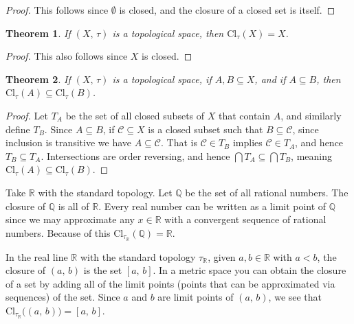 \documentclass{article}
\theoremstyle{plain}
\newtheorem{theorem}{Theorem}[section]
\theoremstyle{normal}
\newenvironment{example}{%
    \pushQED{\qed}\renewcommand{\qedsymbol}{$\blacksquare$}\examplex%
}{%
    \popQED\endexamplex%
}
\begin{document}
        \begin{proof}
            This follows since $\emptyset$ is closed, and the closure of a
            closed set is itself.
        \end{proof}
        \begin{theorem}
            If $(X,\,\tau)$ is a topological space, then
            $\textrm{Cl}_{\tau}(X)=X$.
        \end{theorem}
        \begin{proof}
            This also follows since $X$ is closed.
        \end{proof}
        \begin{theorem}
            If $(X,\,\tau)$ is a topological space, if $A,B\subseteq{X}$, and
            if $A\subseteq{B}$, then
            $\textrm{Cl}_{\tau}(A)\subseteq\textrm{Cl}_{\tau}(B)$.
        \end{theorem}
        \begin{proof}
            Let $T_{A}$ be the set of all closed subsets of $X$ that contain
            $A$, and similarly define $T_{B}$. Since $A\subseteq{B}$, if
            $\mathcal{C}\subseteq{X}$ is a closed subset such that
            $B\subseteq\mathcal{C}$, since inclusion is transitive we have
            $A\subseteq\mathcal{C}$. That is $\mathcal{C}\in{T}_{B}$ implies
            $\mathcal{C}\in{T}_{A}$, and hence
            $T_{B}\subseteq{T}_{A}$. Intersections are order reversing, and
            hence $\bigcap{T}_{A}\subseteq\bigcap{T}_{B}$, meaning
            $\textrm{Cl}_{\tau}(A)\subseteq\textrm{Cl}_{\tau}(B)$.
        \end{proof}
        \begin{example}
            Take $\mathbb{R}$ with the standard topology. Let $\mathbb{Q}$
            be the set of all rational numbers. The closure of
            $\mathbb{Q}$ is all of $\mathbb{R}$. Every real number can be
            written as a limit point of $\mathbb{Q}$ since we may approximate
            any $x\in\mathbb{R}$ with a convergent sequence of rational numbers.
            Because of this
            $\textrm{Cl}_{\tau_{\mathbb{R}}}(\mathbb{Q})=\mathbb{R}$.
        \end{example}
        \begin{example}
            In the real line $\mathbb{R}$ with the standard topology
            $\tau_{\mathbb{R}}$, given $a,b\in\mathbb{R}$ with $a<b$, the
            closure of $(a,\,b)$ is the set $[a,\,b]$. In a metric space
            you can obtain the closure of a set by adding all of the
            limit points (points that can be approximated via sequences) of
            the set. Since $a$ and $b$ are limit points of $(a,\,b)$, we
            see that $\textrm{Cl}_{\tau_{\mathbb{R}}}\big((a,\,b)\big)=[a,\,b]$.
        \end{example}
\end{document}
